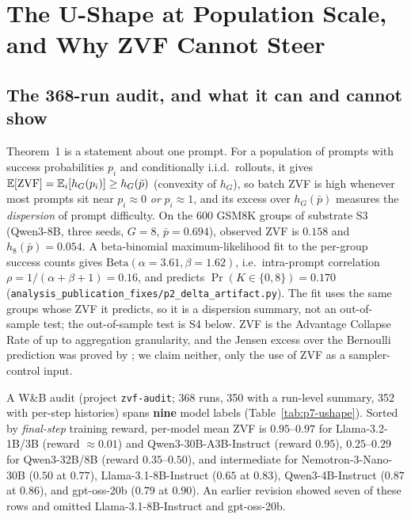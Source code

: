 \section{The U-Shape at Population Scale, and Why ZVF Cannot Steer}
\label{sec:p7-ushape}

\subsection{The 368-run audit, and what it can and cannot show}
\label{sec:p7-audit}
Theorem~1 is a statement about one prompt. For a population of prompts with
success probabilities $p_i$ and conditionally i.i.d.\ rollouts, it gives
$\mathbb{E}[\mathrm{ZVF}]=\mathbb{E}_i[h_G(p_i)]\ge h_G(\bar p)$ (convexity of $h_G$), so batch
ZVF is high whenever most prompts sit near $p_i\approx0$ \emph{or}
$p_i\approx1$, and its excess over $h_G(\bar p)$ measures the
\emph{dispersion} of prompt difficulty. On the 600 GSM8K groups of substrate
S3 (Qwen3-8B, three seeds, $G{=}8$, $\bar p=0.694$), observed ZVF is $0.158$
and $h_8(\bar p)=0.054$. A beta-binomial maximum-likelihood fit to the
per-group success counts gives $\mathrm{Beta}(\alpha{=}3.61,\beta{=}1.62)$,
i.e.\ intra-prompt correlation $\rho=1/(\alpha+\beta+1)=0.16$, and predicts
$\Pr(K\in\{0,8\})=0.170$
(\texttt{analysis\_publication\_fixes/p2\_delta\_artifact.py}). The fit uses the
same groups whose ZVF it predicts, so it is a dispersion summary, not an
out-of-sample test; the out-of-sample test is S4 below. ZVF is the
Advantage Collapse Rate of \citet{he2026advantage} up to aggregation
granularity, and the Jensen excess over the Bernoulli prediction was proved by
\citet{nie2026gradstarvation}; we claim neither, only the use of ZVF as a
sampler-control input.

A W\&B audit (project \texttt{zvf-audit}; 368 runs, 350 with a run-level
summary, 352 with per-step histories) spans \textbf{nine} model labels
(Table~\ref{tab:p7-ushape}). Sorted by \emph{final-step} training reward,
per-model mean ZVF is $0.95$--$0.97$ for Llama-3.2-1B/3B (reward $\approx0.01$)
and Qwen3-30B-A3B-Instruct (reward $0.95$), $0.25$--$0.29$ for Qwen3-32B/8B
(reward $0.35$--$0.50$), and intermediate for Nemotron-3-Nano-30B
($0.50$ at $0.77$), Llama-3.1-8B-Instruct ($0.65$ at $0.83$), Qwen3-4B-Instruct
($0.87$ at $0.86$), and gpt-oss-20b ($0.79$ at $0.90$). An earlier revision
showed seven of these rows and omitted Llama-3.1-8B-Instruct and gpt-oss-20b.


